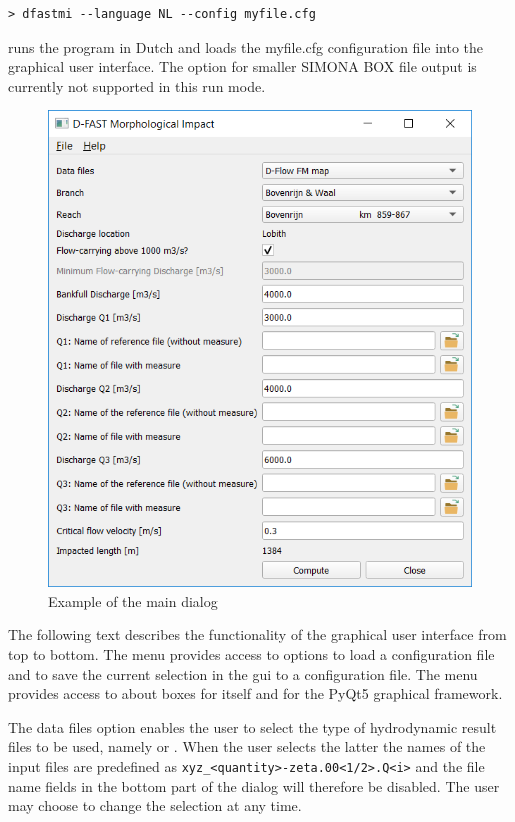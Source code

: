 \begin{Verbatim}
> dfastmi --language NL --config myfile.cfg
\end{Verbatim}

runs the program in Dutch and loads the myfile.cfg configuration file into the graphical user interface.
The  option for smaller SIMONA BOX file output is currently not supported in this run mode.

\begin{figure}
\center
\includegraphics[width=12cm]{figures/main_dialog.png}
\caption{Example of the main dialog}
\end{figure}

The following text describes the functionality of the graphical user interface from top to bottom.
The  menu provides access to options to load a configuration file and to save the current selection in the gui to a configuration file.
The  menu provides access to about boxes for \dfastmi itself and for the PyQt5 graphical framework.

The data files option enables the user to select the type of hydrodynamic result files to be used, namely  or .
When the user selects the latter the names of the input files are predefined as \texttt{xyz\_<quantity>-zeta.00<1/2>.Q<i>} and the file name fields in the bottom part of the dialog will therefore be disabled.
The user may choose to change the selection at any time.


